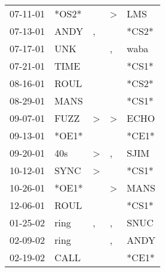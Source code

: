 \begin{supertabular}{p{0.07\textwidth}p{0.06\textwidth}p{0.02\textwidth}p{0.02\textwidth}p{0.06\textwidth}}
 07-11-01\textsuperscript{} &                            *OS2* &                  &  \textgreater &            LMS\textsuperscript{} \\
 07-13-01\textsuperscript{} &           ANDY\textsuperscript{} &                , &               &                            *CS2* \\
 07-17-01\textsuperscript{} &            UNK\textsuperscript{} &                  &             , &           waba\textsuperscript{} \\
 07-21-01\textsuperscript{} &           TIME\textsuperscript{} &                  &               &                            *CS1* \\
 08-16-01\textsuperscript{} &           ROUL\textsuperscript{} &                  &               &                            *CS2* \\
 08-29-01\textsuperscript{} &           MANS\textsuperscript{} &                  &               &                            *CS1* \\
 09-07-01\textsuperscript{} &           FUZZ\textsuperscript{} &     \textgreater &  \textgreater &           ECHO\textsuperscript{} \\
 09-13-01\textsuperscript{} &                            *OE1* &                  &               &                            *CE1* \\
 09-20-01\textsuperscript{} &            40s\textsuperscript{} &     \textgreater &             , &           SJIM\textsuperscript{} \\
 10-12-01\textsuperscript{} &           SYNC\textsuperscript{} &     \textgreater &               &                            *CS1* \\
 10-26-01\textsuperscript{} &                            *OE1* &                  &  \textgreater &           MANS\textsuperscript{} \\
 12-06-01\textsuperscript{} &           ROUL\textsuperscript{} &                  &               &                            *CS1* \\
 01-25-02\textsuperscript{} &           ring\textsuperscript{} &                , &             , &           SNUC\textsuperscript{} \\
 02-09-02\textsuperscript{} &           ring\textsuperscript{} &                  &             , &           ANDY\textsuperscript{} \\
 02-19-02\textsuperscript{} &           CALL\textsuperscript{} &                  &               &                            *CE1* \\

\end{supertabular}
